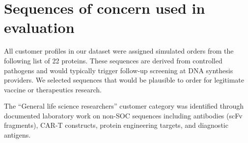 \documentclass[utf8]{frontiers_suppmat}
\begin{document}
\onecolumn
{}

\title[Supplementary Material]{{}}

\maketitle

\section{Sequences of concern used in evaluation}

All customer profiles in our dataset were assigned simulated orders from the following list of 22 proteins. These sequences are derived from controlled pathogens and would typically trigger follow-up screening at DNA synthesis providers. We selected sequences that would be plausible to order for legitimate vaccine or therapeutics research.

The ``General life science researchers'' customer category was identified through documented laboratory work on non-SOC sequences including antibodies (scFv fragments), CAR-T constructs, protein engineering targets, and diagnostic antigens.
\end{document}
